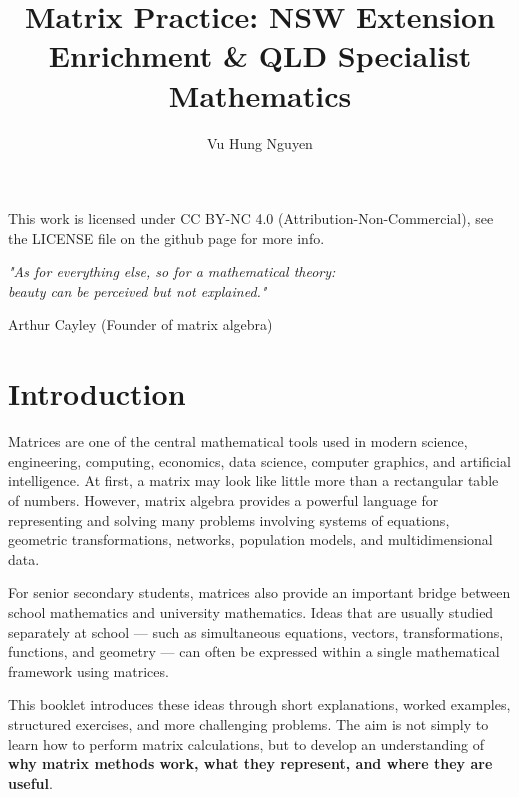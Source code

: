 \documentclass[12pt]{article}
\author{Vu Hung Nguyen}
\title{Matrix Practice: NSW Extension Enrichment \& QLD Specialist Mathematics}
\date{}
\begin{document}


\newpage



\begingroup\small\noindent This work is licensed under CC BY-NC 4.0 (Attribution-Non-Commercial), see the LICENSE file on the github page for more info.\par\endgroup

\newpage

\thispagestyle{empty}
\vspace*{\fill}
\begin{center}
\itshape
"As for everything else, so for a mathematical theory:\\
beauty can be perceived but not explained."

\vspace{1em}
\normalfont Arthur Cayley (Founder of matrix algebra)
\end{center}
\vspace*{\fill}

\newpage

\tableofcontents
\newpage

\section{Introduction}

Matrices are one of the central mathematical tools used in modern science, engineering, computing, economics, data science, computer graphics, and artificial intelligence. At first, a matrix may look like little more than a rectangular table of numbers. However, matrix algebra provides a powerful language for representing and solving many problems involving systems of equations, geometric transformations, networks, population models, and multidimensional data.

For senior secondary students, matrices also provide an important bridge between school mathematics and university mathematics. Ideas that are usually studied separately at school --- such as simultaneous equations, vectors, transformations, functions, and geometry --- can often be expressed within a single mathematical framework using matrices.

This booklet introduces these ideas through short explanations, worked examples, structured exercises, and more challenging problems. The aim is not simply to learn how to perform matrix calculations, but to develop an understanding of \textbf{why matrix methods work, what they represent, and where they are useful}.
\end{document}
